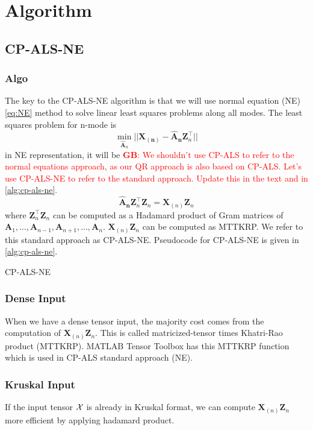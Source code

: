 \documentclass{article}
\newcommand{\mat}[1]{\mathbf{#1}}
\newcommand{\T}[2][]{#1{\mathbf{\cal{#2}}}} 						%
\newcommand{\GB}[1]{\textcolor{red}{\textbf{GB}: #1}}
\begin{document}
\section{Algorithm}
\subsection{CP-ALS-NE}
\subsubsection{Algo}


The key to the CP-ALS-NE algorithm is that we will use normal equation (NE) \cref{eq:NE} method to solve linear least squares problems along all modes.
The least squares problem for n-mode is
$$\min_{\mat{\hat{A}}_n}||\mat{X_{(n)}} - {\mat{\hat{A}_n}}\mat{Z}^\top_n ||$$
in NE representation, it will be
\GB{We shouldn't use CP-ALS to refer to the normal equations approach, as our QR approach is also based on CP-ALS.  Let's use CP-ALS-NE to refer to the standard approach.  Update this in the text and in \cref{alg:cp-als-ne}.}
\begin{equation}
  \mat{\hat{A}_n}\mat{Z}_n^\top\mat{Z}_n = \mat{X}_{(n)}\mat{Z}_n
  \label{eq:CP-NE}
\end{equation}
where $\mat{Z}_n^\top\mat{Z}_n$ can be computed as a Hadamard product of Gram matrices of $\mat{A}_{1}, \dots, \mat{A}_{n-1}, \mat{A}_{n+1}, \dots, \mat{A}_{n}$.
$\mat{X}_{(n)}\mat{Z}_n$ can be computed as MTTKRP.
We refer to this standard approach as CP-ALS-NE. Pseudocode for CP-ALS-NE is given in \cref{alg:cp-als-ne}.
\begin{algorithm}[!ht]
  \caption{CP-ALS-NE}
  \label{alg:cp-als-ne}
  
\end{algorithm}
\subsubsection{Dense Input}
When we have a dense tensor input, the majority cost comes from the computation of $\mat{X}_{(n)}\mat{Z}_n$.
This is called matricized-tensor times Khatri-Rao product (MTTKRP).
MATLAB Tensor Toolbox has this MTTKRP function which is used in CP-ALS standard approach (NE).

\subsubsection{Kruskal Input}
If the input tensor $\T[]{X}$ is already in Kruskal format, we can compute $\mat{X}_{(n)}\mat{Z}_n$ more efficient by applying hadamard product.
\end{document}
